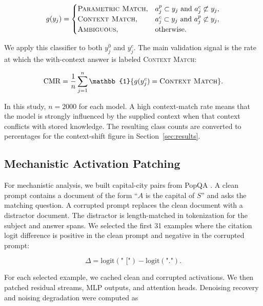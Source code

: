 \documentclass[11pt]{article}
\begin{document}
\begin{equation}
    g(y_j)=
    \begin{cases}
    \textsc{Parametric\ Match}, & a_j^{p} \subset y_j \text{ and } a_j^{c} \not\subset y_j, \\
    \textsc{Context\ Match}, & a_j^{c} \subset y_j \text{ and } a_j^{p} \not\subset y_j, \\
    \textsc{Ambiguous}, & \text{otherwise.}
    \end{cases}
\end{equation}

We apply this classifier to both $y_j^{0}$ and $y_j^{c}$. The main validation signal is the rate at which the with-context answer is labeled \textsc{Context Match}:

\begin{equation}
    \mathrm{CMR}=\frac{1}{n}\sum_{j=1}^{n}\mathbb{1}\{g(y_j^{c})=\textsc{Context\ Match}\}.
\end{equation}

In this study, $n=2000$ for each model. A high context-match rate means that the model is strongly influenced by the supplied context when that context conflicts with stored knowledge. The resulting class counts are converted to percentages for the context-shift figure in Section~\ref{sec:results}.

\subsection{Mechanistic Activation Patching}

For mechanistic analysis, we built capital-city pairs from PopQA \cite{mallen2023popqa}. A clean prompt contains a document of the form ``$A$ is the capital of $S$'' and asks the matching question. A corrupted prompt replaces the clean document with a distractor document. The distractor is length-matched in tokenization for the subject and answer spans. We selected the first 31 examples where the citation logit difference is positive in the clean prompt and negative in the corrupted prompt:

\begin{equation}
    \Delta = \mathrm{logit}(\texttt{" ["}) - \mathrm{logit}(\texttt{"."}).
\end{equation}

For each selected example, we cached clean and corrupted activations. We then patched residual streams, MLP outputs, and attention heads. Denoising recovery and noising degradation were computed as
\end{document}
